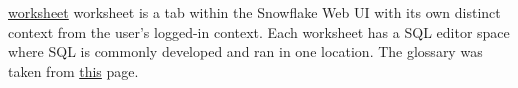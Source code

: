 \documentclass[9pt]{innovativeinnovation-cheatsheet}
\begin{document}
\begin{multicols}{3}
      \item \href{https://docs.snowflake.net/manuals/user-guide/ui-worksheet.html}{worksheet}  worksheet is a tab within the Snowflake Web UI with its own distinct context from the user's logged-in context. Each worksheet has a SQL editor space where SQL is commonly developed and ran in one location.
\ee{}
The glossary was taken from \href{https://community.snowflake.com/s/article/30-Second-Snowflake-Cloud-Data-Warehouse-Cheat-Sheet}{this} page.

\vfill


\end{multicols}
\end{document}
